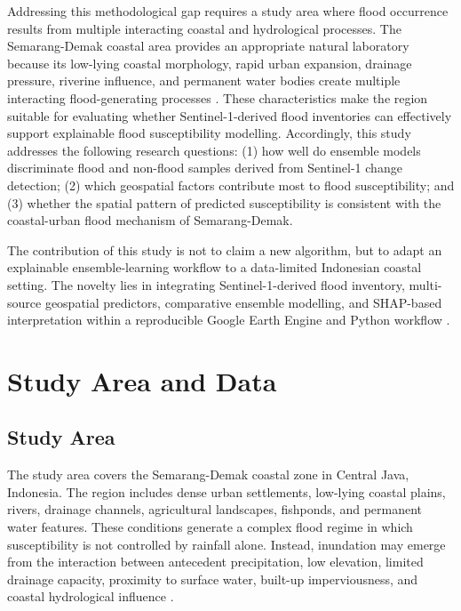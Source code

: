 \documentclass[11pt,twoside]{article}
\begin{document}
Addressing this methodological gap requires a study area where flood occurrence results from multiple interacting coastal and hydrological processes. The Semarang-Demak coastal area provides an appropriate natural laboratory because its low-lying coastal morphology, rapid urban expansion, drainage pressure, riverine influence, and permanent water bodies create multiple interacting flood-generating processes \cite{Husnayaen2018, Sakina2025}. These characteristics make the region suitable for evaluating whether Sentinel-1-derived flood inventories can effectively support explainable flood susceptibility modelling. Accordingly, this study addresses the following research questions: (1) how well do ensemble models discriminate
flood and non-flood samples derived from Sentinel-1 change detection; (2) which
geospatial factors contribute most to flood susceptibility; and (3) whether the
spatial pattern of predicted susceptibility is consistent with the coastal-urban
flood mechanism of Semarang-Demak.
 
The contribution of this study is not to claim a new algorithm, but to adapt an
explainable ensemble-learning workflow to a data-limited Indonesian coastal
setting. The novelty lies in integrating Sentinel-1-derived flood inventory,
multi-source geospatial predictors, comparative ensemble modelling, and
SHAP-based interpretation within a reproducible Google Earth Engine and Python
workflow \cite{gorelick2017}.
 
\section{Study Area and Data}\label{study-area-and-data}
 
\subsection{Study Area}\label{study-area}
 
The study area covers the Semarang-Demak coastal zone in Central Java,
Indonesia. The region includes dense urban settlements, low-lying coastal
plains, rivers, drainage channels, agricultural landscapes, fishponds, and
permanent water features. These conditions generate a complex flood regime in
which susceptibility is not controlled by rainfall alone. Instead, inundation
may emerge from the interaction between antecedent precipitation, low elevation,
limited drainage capacity, proximity to surface water, built-up imperviousness,
and coastal hydrological influence \cite{marfai2008}.
\end{document}
